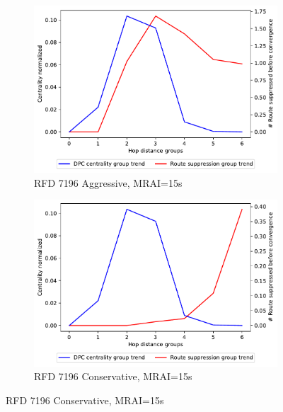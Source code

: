 \begin{figure}[H]
\begin{subfigure}[b]{0.325\textwidth}
     \end{subfigure}
     \hfill
     \begin{subfigure}[b]{0.325\textwidth}
         \centering
         \includegraphics[width=\textwidth]{images/RFD/miceVSelephants/MultiMRAI/15/mice/cisco_1000_RFD_7196_aggressive_nodeConvergence_centVSsup_trend.pdf}
         \caption{\scriptsize RFD 7196 Aggressive, MRAI=15s}
         \label{fig:1000_7196RFDA_centVSsup_mices_MRAI15}
     \end{subfigure}
     \hfill
     \begin{subfigure}[b]{0.325\textwidth}
         \centering
         \includegraphics[width=\textwidth]{images/RFD/miceVSelephants/MultiMRAI/15/mice/cisco_1000_RFD_7196_conservative_nodeConvergence_centVSsup_trend.pdf}
         \caption{\scriptsize RFD 7196 Conservative, MRAI=15s}
         \label{fig:1000_7196RFDC_centVSsup_mices_MRAI15}

\end{subfigure}
\end{figure}
